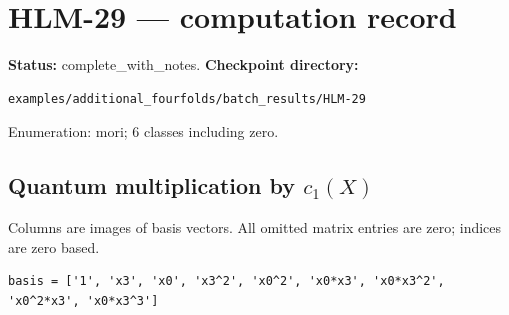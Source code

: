 \documentclass[10pt,a4paper]{article}
\begin{document}
\clearpage\section*{HLM-29 --- computation record}
\textbf{Status:} complete\_with\_notes.
\textbf{Checkpoint directory:}
\begin{lstlisting}
examples/additional_fourfolds/batch_results/HLM-29
\end{lstlisting}

Enumeration: mori; 6 classes including zero.
\subsection*{Quantum multiplication by $c_1(X)$}
Columns are images of basis vectors. All omitted matrix entries are zero; indices are zero based.

\begin{lstlisting}
basis = ['1', 'x3', 'x0', 'x3^2', 'x0^2', 'x0*x3', 'x0*x3^2', 'x0^2*x3', 'x0*x3^3']
\end{lstlisting}
\end{document}
